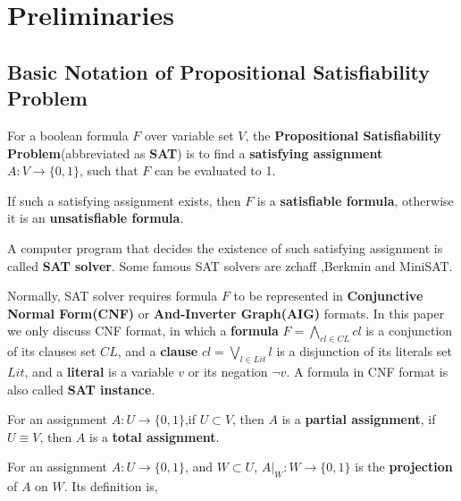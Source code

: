 \documentclass[journal]{IEEEtran}
\begin{document}
\section{Preliminaries}\label{sec_pre}

\subsection{Basic Notation of Propositional Satisfiability Problem}
For a boolean formula $F$ over variable set $V$,
the \textbf{Propositional Satisfiability Problem}(abbreviated as \textbf{SAT}) is to find a \textbf{satisfying assignment} $A:V\to \{0,1\}$,
such that $F$ can be evaluated to 1.

If such a satisfying assignment exists, then $F$ is a \textbf{satisfiable formula},
otherwise it is an \textbf{unsatisfiable formula}.

A computer program that decides the existence of such satisfying assignment is called \textbf{SAT solver}.
Some famous SAT solvers are zchaff\cite{CHAFF} ,Berkmin\cite{BERKMIN} and MiniSAT\cite{EXTSAT}.

Normally,
SAT solver requires formula $F$ to be represented in \textbf{Conjunctive Normal Form(CNF)} or \textbf{And-Inverter Graph(AIG)} formats.
In this paper we only discuss CNF format,
in which a \textbf{formula} $F=\bigwedge_{cl\in CL}cl$ is a conjunction of its clauses set $CL$,
and a \textbf{clause} $cl=\bigvee_{l\in Lit}l$ is a disjunction of its literals set $Lit$,
and a \textbf{literal} is a variable $v$ or its negation $\neg v$.
A formula in CNF format is also called \textbf{SAT instance}.

For an assignment $A:U\to \{0,1\}$,if $U\subset V$, then $A$ is a \textbf{partial assignment},
if $U\equiv V$, then $A$ is a \textbf{total assignment}.

For an assignment $A:U\to \{0,1\}$,
and $W\subset U$, $A|_W:W\to \{0,1\}$ is the \textbf{projection} of $A$ on $W$.
Its definition is,
\begin{displaymath}
\end{displaymath}
\end{document}

